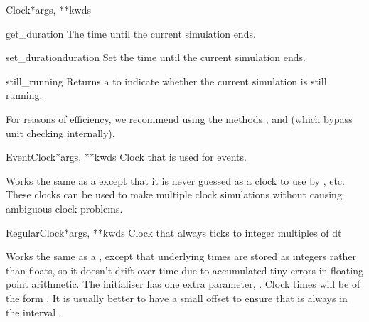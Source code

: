 \documentclass[letterpaper,10pt,english]{manual}
\begin{document}
\begin{classdesc}{Clock}{*args, **kwds}
\hypertarget{brian.Clock.get_duration}{}\begin{methoddesc}{get\_duration}{}
The time until the current simulation ends.
\end{methoddesc}

\hypertarget{brian.Clock.set_duration}{}\begin{methoddesc}{set\_duration}{duration}
Set the time until the current simulation ends.
\end{methoddesc}

\hypertarget{brian.Clock.still_running}{}\begin{methoddesc}{still\_running}{}
Returns a  to indicate whether the current
simulation is still running.
\end{methoddesc}

For reasons of efficiency, we recommend using the methods
\hyperlink{brian.Clock.tick}{}, \hyperlink{brian.Clock.set_duration}{} and \hyperlink{brian.Clock.still_running}{}
(which bypass unit checking internally).
\end{classdesc}

\hypertarget{brian.EventClock}{}\begin{classdesc}{EventClock}{*args, **kwds}
Clock that is used for events.

Works the same as a \hyperlink{brian.Clock}{} except that it is never guessed as a clock to
use by \hyperlink{brian.NeuronGroup}{}, etc. These clocks can be used to make multiple clock
simulations without causing ambiguous clock problems.
\end{classdesc}

\hypertarget{brian.RegularClock}{}\begin{classdesc}{RegularClock}{*args, **kwds}
Clock that always ticks to integer multiples of dt

Works the same as a \hyperlink{brian.Clock}{}, except that underlying times are stored as
integers rather than floats, so it doesn't drift over time due to accumulated
tiny errors in floating point arithmetic. The initialiser
has one extra parameter, . Clock times will be of the form
. It is usually better to have a small offset to ensure that
 is always in the interval \code{{[}i*dt, (i+1)*dt)}.
\end{classdesc}
\end{document}
